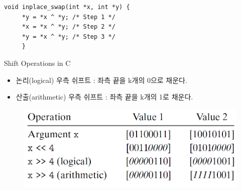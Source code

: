 \begin{lstlisting}[style = CStyle]
    void inplace_swap(int *x, int *y) {
     *y = *x ^ *y; /* Step 1 */
     *x = *x ^ *y; /* Step 2 */
     *y = *x ^ *y; /* Step 3 */
     }
    \end{lstlisting}
    
    
    Shift Operations in C
    
    \begin{itemize}
        \item  논리(logical) 우측 쉬프트 : 좌측 끝을 k개의 0으로 채운다.
        \item  산출(arithmetic) 우측 쉬프트 : 좌측 끝을 k개의 1로 채운다.
    \end{itemize}
    
    \begin{figure}[h!]
        \centering
        \includegraphics[scale=0.4]{pic/section12/shift}
    \end{figure}
    
